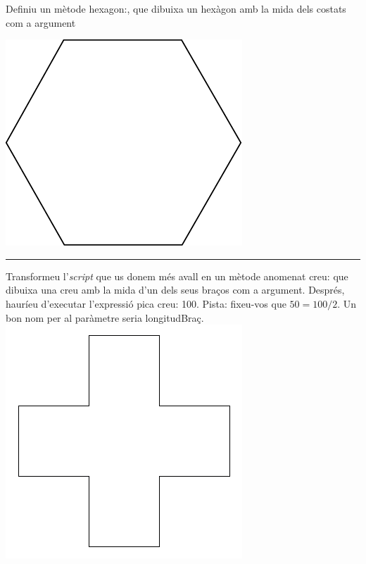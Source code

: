 \begin{center}
\colorbox{black}{}
\end{center}
{\small
\noindent
Definiu un mètode \textsf{hexagon:}, que dibuixa un hexàgon amb la mida dels costats com a argument}
\begin{center}
\includegraphics[scale=1]{Imatges/figuraE14-1.pdf} 
\end{center}
\noindent
\rule{\textwidth}{3pt}
\newpage
\begin{center}
\colorbox{black}{}
\end{center}
{\small
\noindent
Transformeu l'\emph{script} que us donem més avall en un mètode anomenat \textsf{creu:} que dibuixa una creu amb la mida d'un dels seus braços com a argument. Després, hauríeu d'executar l'expressió \textsf{pica creu: 100}. Pista: fixeu-vos que $50 = 100 / 2$. Un bon nom per al paràmetre seria \textsf{longitudBraç}.}\\
\includegraphics[scale=0.35]{Imatges/figuraE14-2.png} 

